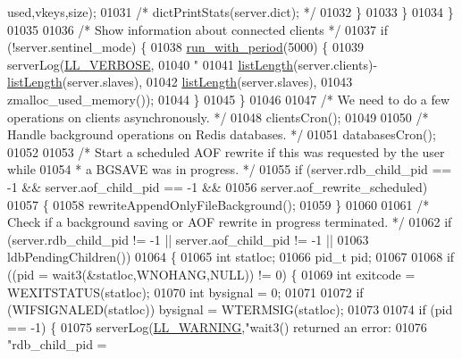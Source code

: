\begin{DoxyCode}
{{{{{{      used,vkeys,size);
01031                 \textcolor{comment}{/* dictPrintStats(server.dict); */}
01032             \}
01033         \}
01034     \}
01035 
01036     \textcolor{comment}{/* Show information about connected clients */}
01037     \textcolor{keywordflow}{if} (!server.sentinel\_mode) \{
01038         \hyperlink{server_8h_aeb204872adbaabc0bd56c64f562b7928}{run\_with\_period}(5000) \{
01039             serverLog(\hyperlink{server_8h_a479b60032f8da6d8ad72e1a9d0809950}{LL\_VERBOSE},
01040                 \textcolor{stringliteral}{"%
01041                 \hyperlink{adlist_8h_afde0ab079f934670e82119b43120e94b}{listLength}(server.clients)-\hyperlink{adlist_8h_afde0ab079f934670e82119b43120e94b}{listLength}(server.slaves),
01042                 \hyperlink{adlist_8h_afde0ab079f934670e82119b43120e94b}{listLength}(server.slaves),
01043                 zmalloc\_used\_memory());
01044         \}
01045     \}
01046 
01047     \textcolor{comment}{/* We need to do a few operations on clients asynchronously. */}
01048     clientsCron();
01049 
01050     \textcolor{comment}{/* Handle background operations on Redis databases. */}
01051     databasesCron();
01052 
01053     \textcolor{comment}{/* Start a scheduled AOF rewrite if this was requested by the user while}
01054 \textcolor{comment}{     * a BGSAVE was in progress. */}
01055     \textcolor{keywordflow}{if} (server.rdb\_child\_pid == -1 && server.aof\_child\_pid == -1 &&
01056         server.aof\_rewrite\_scheduled)
01057     \{
01058         rewriteAppendOnlyFileBackground();
01059     \}
01060 
01061     \textcolor{comment}{/* Check if a background saving or AOF rewrite in progress terminated. */}
01062     \textcolor{keywordflow}{if} (server.rdb\_child\_pid != -1 || server.aof\_child\_pid != -1 ||
01063         ldbPendingChildren())
01064     \{
01065         \textcolor{keywordtype}{int} statloc;
01066         pid\_t pid;
01067 
01068         \textcolor{keywordflow}{if} ((pid = wait3(&statloc,WNOHANG,NULL)) != 0) \{
01069             \textcolor{keywordtype}{int} exitcode = WEXITSTATUS(statloc);
01070             \textcolor{keywordtype}{int} bysignal = 0;
01071 
01072             \textcolor{keywordflow}{if} (WIFSIGNALED(statloc)) bysignal = WTERMSIG(statloc);
01073 
01074             \textcolor{keywordflow}{if} (pid == -1) \{
01075                 serverLog(\hyperlink{server_8h_a31229b9334bba7d6be2a72970967a14b}{LL\_WARNING},\textcolor{stringliteral}{"wait3() returned an error: %
01076                     \textcolor{stringliteral}{"rdb\_child\_pid = %
}}}}}}}}}
\end{DoxyCode}
